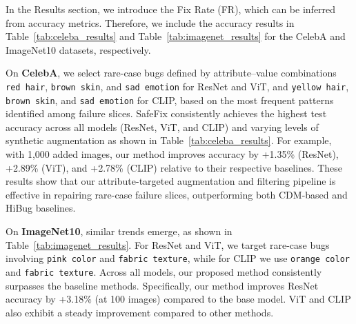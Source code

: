 \documentclass[10pt]{article} %
\newcommand{\model}{SafeFix\xspace}
\newcommand{\hibug}{HiBug\xspace}
\begin{document}
In the Results section, we introduce the Fix Rate (FR), which can be inferred from accuracy metrics. Therefore, we include the accuracy results in Table~\ref{tab:celeba_results} and Table~\ref{tab:imagenet_results} for the CelebA and ImageNet10 datasets, respectively.

On \textbf{CelebA}, we select rare-case bugs defined by attribute–value combinations \texttt{red hair}, \texttt{brown skin}, and \texttt{sad emotion} for ResNet and ViT, and \texttt{yellow hair}, \texttt{brown skin}, and \texttt{sad emotion} for CLIP, based on the most frequent patterns identified among failure slices. \model{} consistently achieves the highest test accuracy across all models (ResNet, ViT, and CLIP) and varying levels of synthetic augmentation as shown in Table~\ref{tab:celeba_results}. For example, with 1{,}000 added images, our method improves accuracy by +1.35\% (ResNet), +2.89\% (ViT), and +2.78\% (CLIP) relative to their respective baselines. These results show that our attribute-targeted augmentation and filtering pipeline is effective in repairing rare-case failure slices, outperforming both CDM-based and \hibug{} baselines.


On \textbf{ImageNet10}, similar trends emerge, as shown in Table~\ref{tab:imagenet_results}. For ResNet and ViT, we target rare-case bugs involving \texttt{pink color} and \texttt{fabric texture}, while for CLIP we use \texttt{orange color} and \texttt{fabric texture}. Across all models, our proposed method consistently surpasses the baseline methods. Specifically, our method improves ResNet accuracy by +3.18\% (at 100 images) compared to the base model. ViT and CLIP also exhibit a steady improvement compared to other methods.
\end{document}
